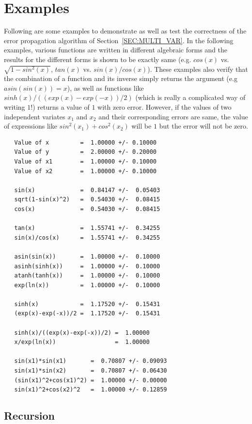 \documentclass[acmtoms,acmnow]{acmtrans2m}
\begin{document}
\section{Examples}
\label{SEC:EXAMPLES}
Following are some examples to demonstrate as well as test the
correctness of the error propagation algorithm of
Section~\ref{SEC:MULTI_VAR}.  In the following examples, various
functions are written in different algebraic forms and the results for
the different forms is shown to be exactly same (e.g. $cos(x)$ vs.
$\sqrt{1-sin^2(x)}$, $tan(x)$ vs. $sin(x)/cos(x)$).  These examples
also verify that the combination of a function and its inverse simply
returns the argument (e.g $asin(sin(x))=x$), as well as functions like
$sinh(x)/((exp(x)-exp(-x))/2)$ (which is really a complicated way of
writing $1$!) returns a value of $1$ with zero error.  However, if the
values of two independent variates $x_1$ and $x_2$ and their
corresponding errors are same, the value of expressions like
$sin^2(x_1) + cos^2(x_2)$ will be $1$ but the error will not be zero.
\begin{verbatim}
   Value of x         =  1.00000 +/- 0.10000
   Value of y         =  2.00000 +/- 0.20000
   Value of x1        =  1.00000 +/- 0.10000
   Value of x2        =  1.00000 +/- 0.10000

   sin(x)             =  0.84147 +/-  0.05403
   sqrt(1-sin(x)^2)   =  0.54030 +/-  0.08415
   cos(x)             =  0.54030 +/-  0.08415

   tan(x)             =  1.55741 +/-  0.34255
   sin(x)/cos(x)      =  1.55741 +/-  0.34255

   asin(sin(x))       =  1.00000 +/-  0.10000
   asinh(sinh(x))     =  1.00000 +/-  0.10000
   atanh(tanh(x))     =  1.00000 +/-  0.10000
   exp(ln(x))         =  1.00000 +/-  0.10000

   sinh(x)            =  1.17520 +/-  0.15431
   (exp(x)-exp(-x))/2 =  1.17520 +/-  0.15431

   sinh(x)/((exp(x)-exp(-x))/2) =  1.00000
   x/exp(ln(x))                 =  1.00000

   sin(x1)*sin(x1)       =  0.70807 +/- 0.09093
   sin(x1)*sin(x2)       =  0.70807 +/- 0.06430
   (sin(x1)^2+cos(x1)^2) =  1.00000 +/- 0.00000
   sin(x1)^2+cos(x2)^2   =  1.00000 +/- 0.12859
\end{verbatim}

\subsection{Recursion}
\end{document}
